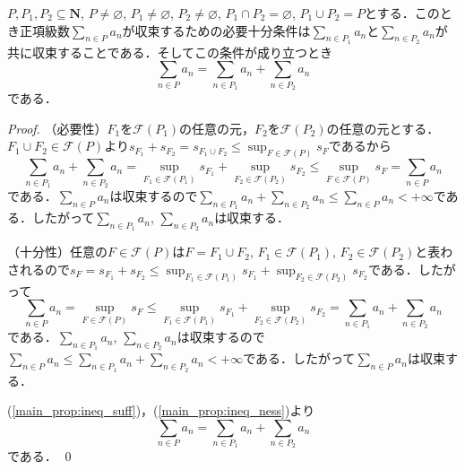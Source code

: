\documentclass[12pt,a4paper]{jsarticle}
\newcommand{\nat}{\mathbf{N}}
\newcommand{\calF}{\mathcal{F}}
\begin{document}
\begin{proposition}\label{main_prop}
    $P, P_1, P_2 \subseteq \nat$, $P \not= \varnothing$, $P_1 \not= \varnothing$, $P_2 \not= \varnothing$, $P_1 \cap P_2 = \varnothing$, $P_1 \cup P_2 = P$とする．このとき正項級数$\sum_{n \in P} a_n$が収束するための必要十分条件は$\sum_{n \in P_1} a_n$と$\sum_{n \in P_2} a_n$が共に収束することである．そしてこの条件が成り立つとき
    \begin{equation*}
        \sum_{n \in P} a_n = \sum_{n \in P_1} a_n + \sum_{n \in P_2} a_n
    \end{equation*}
    である．
\end{proposition}
\begin{proof}
    （必要性）$F_1$を$\calF(P_1)$の任意の元，$F_2$を$\calF(P_2)$の任意の元とする．$F_1 \cup F_2 \in \calF(P)$より$s_{F_1} + s_{F_2} = s_{F_1 \cup F_2} \leq \sup_{F \in \calF(P)} s_F$であるから
    \begin{equation}
        \sum_{n \in P_1} a_n + \sum_{n \in P_2} a_n = \sup_{F_1 \in \calF(P_1)} s_{F_1} + \sup_{F_2 \in \calF(P_2)} s_{F_2} \leq \sup_{F \in \calF(P)} s_F = \sum_{n \in P} a_n \label{main_prop:ineq_suff}
    \end{equation}
    である．$\sum_{n \in P} a_n$は収束するので$\sum_{n \in P_1} a_n + \sum_{n \in P_2} a_n \leq \sum_{n \in P} a_n < +\infty$である．したがって$\sum_{n \in P_1} a_n$, $\sum_{n \in P_2} a_n$は収束する．

    （十分性）任意の$F \in \calF(P)$は$F = F_1 \cup F_2$, $F_1 \in \calF(P_1)$, $F_2 \in \calF(P_2)$と表わされるので$s_F = s_{F_1} + s_{F_2} \leq \sup_{F_1 \in \calF(P_1)} s_{F_1} + \sup_{F_2 \in \calF(P_2)} s_{F_2}$である．したがって
    \begin{equation}
        \sum_{n \in P} a_n = \sup_{F \in \calF(P)} s_F \leq \sup_{F_1 \in \calF(P_1)} s_{F_1} + \sup_{F_2 \in \calF(P_2)} s_{F_2} = \sum_{n \in P_1} a_n + \sum_{n \in P_2} a_n \label{main_prop:ineq_ness}
    \end{equation}
    である．$\sum_{n \in P_1} a_n$, $\sum_{n \in P_2} a_n$は収束するので$\sum_{n \in P} a_n \leq \sum_{n \in P_1} a_n + \sum_{n \in P_2} a_n < +\infty$である．したがって$\sum_{n \in P} a_n$は収束する．

    (\ref{main_prop:ineq_suff})，(\ref{main_prop:ineq_ness})より
    \begin{equation*}
        \sum_{n \in P} a_n = \sum_{n \in P_1} a_n + \sum_{n \in P_2} a_n
    \end{equation*}
    である．
    \qed
\end{proof}
\end{document}
